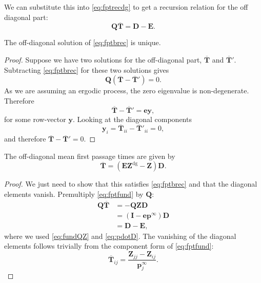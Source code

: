 \documentclass[12pt]{article}
\newcommand{\dg}{^\mathrm{dg}}
\newcommand{\I}{\mathbf{I}}
\newcommand{\onev}{\mathbf{e}}
\newcommand{\onem}{\mathbf{E}}
\newcommand{\MM}{\mathbf{Q}}
\newcommand{\eq}{\mathbf{p}^\infty}
\newcommand{\fpt}{\mathbf{T}}
\newcommand{\fptb}{\overline{\fpt}}
\newcommand{\fund}{\mathbf{Z}}
\newcommand{\D}{\mathbf{D}}
\begin{document}
We can substitute this into \eqref{eq:fptrecdg} to get a recursion relation for the off diagonal part:
%
\begin{equation}\label{eq:fptbrec}
  \MM\fptb = \D-\onem.
\end{equation}
%
\begin{thm}
  The off-diagonal solution of \eqref{eq:fptbrec} is unique.
\end{thm}
\begin{proof}
  Suppose we have two solutions for the off-diagonal part, $\fptb$ and $\fptb'$.
  Subtracting \eqref{eq:fptbrec} for these two solutions gives
  \begin{equation*}
    \MM(\fptb-\fptb')=0.
  \end{equation*}
  As we are assuming an ergodic process, the zero eigenvalue is non-degenerate.
  Therefore
  \begin{equation*}
    \fptb-\fptb' = \onev\mathbf{y},
  \end{equation*}
  for some row-vector $\mathbf{y}$. Looking at the diagonal components
  \begin{equation*}
    \mathbf{y}_{i} = \fptb_{ii}-\fptb'_{ii} = 0,
  \end{equation*}
  and therefore $\fptb-\fptb'=0$.
\end{proof}

\begin{thm}
  The off-diagonal mean first passage times are given by
  \begin{equation}\label{eq:fptfund}
    \fptb = (\onem\fund\dg - \fund)\D.
  \end{equation}
\end{thm}
\begin{proof}
  We just need to show that this satisfies \eqref{eq:fptbrec} and that the diagonal elements vanish.
  Premultiply \eqref{eq:fptfund} by $\MM$:
  \begin{equation*}
  \begin{aligned}
    \MM\fptb &= -\MM\fund\D\\
     &= (\I-\onev\eq)\D \\
     &= \D-\onem,
  \end{aligned}
  \end{equation*}
  where we used \eqref{eq:fundQZ} and \eqref{eq:pdotD}.
  The vanishing of the diagonal elements follows trivially from the component form of \eqref{eq:fptfund}:
%
\begin{equation}\label{eq:fptfundcmpt}
  \fptb_{ij} = \frac{\fund_{jj}-\fund_{ij}}{\eq_j}.
\end{equation}
%

\end{proof}
\end{document}
